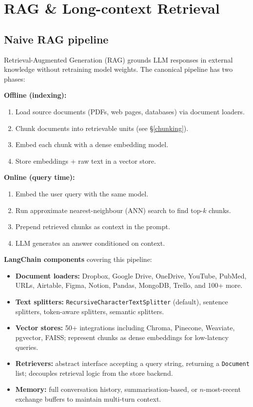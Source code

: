
\section{RAG \& Long-context Retrieval}

\subsection{Naive RAG pipeline}

Retrieval-Augmented Generation (RAG) grounds LLM responses in external knowledge
without retraining model weights. The canonical pipeline has two phases:

\textbf{Offline (indexing):}
\begin{enumerate}
  \item Load source documents (PDFs, web pages, databases) via document loaders.
  \item Chunk documents into retrievable units (see \S\ref{chunking}).
  \item Embed each chunk with a dense embedding model.
  \item Store embeddings + raw text in a vector store.
\end{enumerate}

\textbf{Online (query time):}
\begin{enumerate}
  \item Embed the user query with the same model.
  \item Run approximate nearest-neighbour (ANN) search to find top-$k$ chunks.
  \item Prepend retrieved chunks as context in the prompt.
  \item LLM generates an answer conditioned on context.
\end{enumerate}

\textbf{LangChain components} covering this pipeline:
\begin{itemize}
  \item \textbf{Document loaders:} Dropbox, Google Drive, OneDrive, YouTube, PubMed,
    URLs, Airtable, Figma, Notion, Pandas, MongoDB, Trello, and 100+ more.
  \item \textbf{Text splitters:} \texttt{RecursiveCharacterTextSplitter} (default),
    sentence splitters, token-aware splitters, semantic splitters.
  \item \textbf{Vector stores:} 50+ integrations including Chroma, Pinecone, Weaviate,
    pgvector, FAISS; represent chunks as dense embeddings for low-latency queries.
  \item \textbf{Retrievers:} abstract interface accepting a query string, returning a
    \texttt{Document} list; decouples retrieval logic from the store backend.
  \item \textbf{Memory:} full conversation history, summarisation-based, or $n$-most-recent
    exchange buffers to maintain multi-turn context.
\end{itemize}

